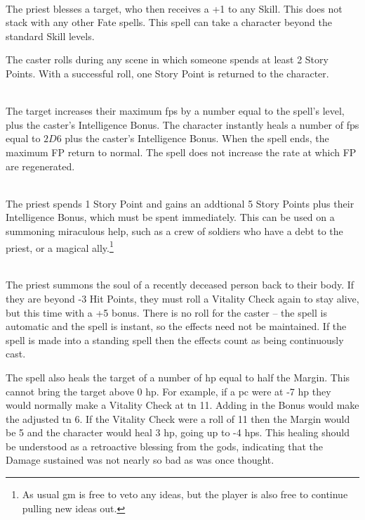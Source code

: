 \begin{multicols}{2}
\\
The priest blesses a target, who then receives a +1 to any Skill.
This does not stack with any other Fate spells.
This spell can take a character beyond the standard Skill levels.

The caster rolls during any scene in which someone spends at least 2 Story Points.  With a successful roll, one Story Point is returned to the character.

\spelllevel

\\
The target increases their maximum \glspl{fp} by a number equal to the spell's level, plus the caster's Intelligence Bonus.
The character instantly heals a number of \glspl{fp} equal to $2D6$ plus the caster's Intelligence Bonus.
When the spell ends, the maximum FP return to normal.
The spell does not increase the rate at which FP are regenerated.

\spelllevel

\\
The priest spends 1 Story Point and gains an addtional 5 Story Points plus their Intelligence Bonus, which must be spent immediately.  This can be used on a summoning miraculous help, such as a crew of soldiers who have a debt to the priest, or a magical ally.\footnote{As usual \gls{gm} is free to veto any ideas, but the player is also free to continue pulling new ideas out.}

\\
The priest summons the soul of a recently deceased person back to their body. If they are beyond -3 Hit Points, they must roll a Vitality Check again to stay alive, but this time with a +5 bonus. There is no roll for the caster -- the spell is automatic and the spell is instant, so the effects need not be maintained. If the spell is made into a standing spell then the effects count as being continuously cast.

The spell also heals the target of a number of \gls{hp} equal to half the Margin.
This cannot bring the target above 0 \gls{hp}.
For example, if a \gls{pc} were at -7 \gls{hp} they would normally make a Vitality Check at \gls{tn} 11.
Adding in the Bonus would make the adjusted \gls{tn} 6.
If the Vitality Check were a roll of 11 then the Margin would be 5 and the character would heal 3 \gls{hp}, going up to -4 \glspl{hp}.
This healing should be understood as a retroactive blessing from the gods, indicating that the Damage sustained was not nearly so bad as was once thought.


\end{multicols}
